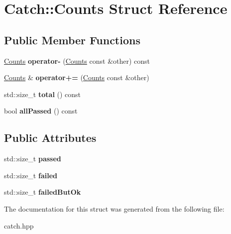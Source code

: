 \hypertarget{structCatch_1_1Counts}{
\section{Catch::Counts Struct Reference}
\label{structCatch_1_1Counts}
}
\subsection*{Public Member Functions}
\begin{DoxyCompactItemize}
\item 
\hypertarget{structCatch_1_1Counts_aedf86fefe33938d132a6981171cd83e6}{
\hyperlink{structCatch_1_1Counts}{Counts} {\bfseries operator-\/} (\hyperlink{structCatch_1_1Counts}{Counts} const \&other) const }
\label{structCatch_1_1Counts_aedf86fefe33938d132a6981171cd83e6}

\item 
\hypertarget{structCatch_1_1Counts_a322a89475cd2cc039140ef371e973677}{
\hyperlink{structCatch_1_1Counts}{Counts} \& {\bfseries operator+=} (\hyperlink{structCatch_1_1Counts}{Counts} const \&other)}
\label{structCatch_1_1Counts_a322a89475cd2cc039140ef371e973677}

\item 
\hypertarget{structCatch_1_1Counts_a9125c662e30114e5c5cc94729b1e9e84}{
std::size\_\-t {\bfseries total} () const }
\label{structCatch_1_1Counts_a9125c662e30114e5c5cc94729b1e9e84}

\item 
\hypertarget{structCatch_1_1Counts_adbbaca552f6017ce69e0d5dc5500bea4}{
bool {\bfseries allPassed} () const }
\label{structCatch_1_1Counts_adbbaca552f6017ce69e0d5dc5500bea4}

\end{DoxyCompactItemize}
\subsection*{Public Attributes}
\begin{DoxyCompactItemize}
\item 
\hypertarget{structCatch_1_1Counts_ad28daaf3de28006400208b6dd0c631e6}{
std::size\_\-t {\bfseries passed}}
\label{structCatch_1_1Counts_ad28daaf3de28006400208b6dd0c631e6}

\item 
\hypertarget{structCatch_1_1Counts_a19982a3817a3bc2c07f0290e71f497a3}{
std::size\_\-t {\bfseries failed}}
\label{structCatch_1_1Counts_a19982a3817a3bc2c07f0290e71f497a3}

\item 
\hypertarget{structCatch_1_1Counts_ac090973a2ff51394cd452718e75c073e}{
std::size\_\-t {\bfseries failedButOk}}
\label{structCatch_1_1Counts_ac090973a2ff51394cd452718e75c073e}

\end{DoxyCompactItemize}


The documentation for this struct was generated from the following file:\begin{DoxyCompactItemize}
\item 
catch.hpp\end{DoxyCompactItemize}
